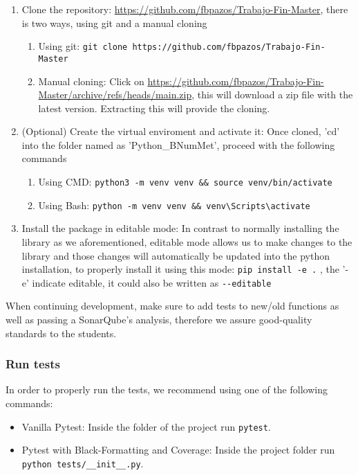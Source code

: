 \begin{enumerate}
       \item Clone the repository: \href{https://github.com/fbpazos/Trabajo-Fin-Master}{https://github.com/fbpazos/Trabajo-Fin-Master}, there is two ways, using git and a manual cloning
    \begin{enumerate}
        \item Using git: \lstinline|git clone https://github.com/fbpazos/Trabajo-Fin-Master|
        
        \item Manual cloning: Click on \href{https://github.com/fbpazos/Trabajo-Fin-Master/archive/refs/heads/main.zip}{https://github.com/fbpazos/Trabajo-Fin-Master/archive/refs/heads/main.zip}, this will download a zip file with the latest version. Extracting this will provide the cloning.
    \end{enumerate}

    \item (Optional) Create the virtual enviroment and activate it: Once cloned, 'cd' into the folder named as 'Python\_BNumMet', proceed with the following commands
    \begin{enumerate}
        \item Using CMD: \lstinline|python3 -m venv venv && source venv/bin/activate|
        \item Using Bash: \lstinline|python -m venv venv && venv\Scripts\activate|
    \end{enumerate}
    
    \item Install the package in editable mode: In contrast to normally installing the library as we aforementioned, editable mode allows us to make changes to the library and those changes will automatically be updated into the python installation, to properly install it using this mode: \lstinline|pip install -e .| , the '-e' indicate editable, it could also be written as \lstinline|--editable|

\end{enumerate}

When continuing development, make sure to add tests to new/old functions as well as passing a SonarQube's analysis, therefore we assure good-quality standards to the students.
\subsubsection{Run tests}
In order to properly run the tests, we recommend using one of the following commands:
\begin{itemize}
    \item Vanilla Pytest: Inside the folder of the project run \lstinline|pytest|.
    \item Pytest with Black-Formatting and Coverage: Inside the project folder run \lstinline|python tests/__init__.py|.
\end{itemize}




